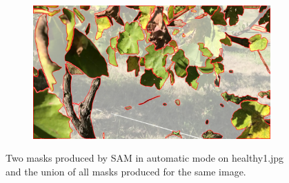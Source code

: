 \documentclass[runningheads]{llncs}
\begin{document}
\begin{figure}[h!]

\begin{subfigure}[b]{.66\linewidth}
\includegraphics[width=\linewidth]{imgs/healthy_033_cam3_mask_over_healthy_033_cam3.png}
\caption{}
\label{fig:sam1e}
\end{subfigure}
\label{fig:individual_SAM_mask_and_their_union}
\caption{Two masks produced by SAM in automatic mode on {\color{red} healthy1.jpg} and the union of all masks produced for the same image.}
\end{figure}
\end{document}
